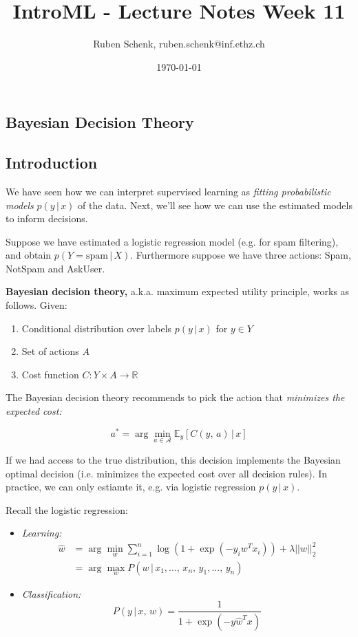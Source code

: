 \documentclass[a4paper]{extarticle}
\title{IntroML - Lecture Notes Week 11}
\author{Ruben Schenk, ruben.schenk@inf.ethz.ch}
\date{\today}
\begin{document}
\maketitle

\subsection{Bayesian Decision Theory}

\subsection{Introduction}

We have seen how we can interpret supervised learning as \textit{fitting probabilistic models} $p(y \, | \, x)$ of the data. Next, we'll see how we can use the estimated models to inform decisions.

Suppose we have estimated a logistic regression model (e.g. for spam filtering), and obtain $p(Y = \text{spam} \, | \, X)$. Furthermore suppose we have three actions: Spam, NotSpam and AskUser.

\textbf{Bayesian decision theory,} a.k.a. maximum expected utility principle, works as follows. Given:

\begin{enumerate}
    \item Conditional distribution over labels $p(y \, | \, x)$ for $y \in Y$
    \item Set of actions $A$
    \item Cost function $C : Y \times A \to \mathbb{R}$
\end{enumerate}

The Bayesian decision theory recommends to pick the action that \textit{minimizes the expected cost:}

\[
    a^* = \arg \min_{a \in \mathcal{A}} \mathbb{E}_y[C(y, \, a) \, | \, x]
\]

If we had access to the true distribution, this decision implements the Bayesian optimal decision (i.e. minimizes the expected cost over all decision rules). In practice, we can only estiamte it, e.g. via logistic regression $p(y \, | \, x)$.

Recall the logistic regression:
\begin{itemize}
    \item \textit{Learning:}
    \begin{align*}
        \hat{w} &= \arg \min_w \sum_{i = 1}^n \log (1 + \exp(-y_iw^Tx_i)) + \lambda ||w||_2^2\\
        &= \arg \max_w P(w \, | \, x_1,..., \, x_n, \, y_1,..., \, y_n)
    \end{align*}
    \item \textit{Classification:}
    \[
        P(y \, | \, x, \, w) = \frac{1}{1 + \exp(-y\hat{w}^Tx)}
    \]
\end{itemize}
\end{document}
